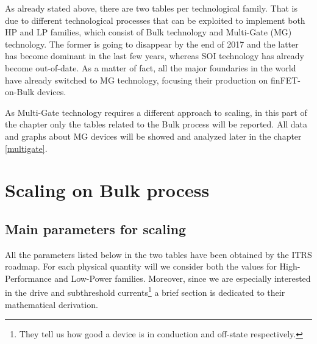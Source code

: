 \documentclass[a4paper, 12pt, twoside, openright]{report}
\begin{document}

As already stated above, there are two tables per technological family. That is due to different technological processes that can be exploited to implement both HP and LP families, which consist of Bulk technology and Multi-Gate (MG) technology. The former is going to disappear by the end of 2017 and the latter has become dominant in the last few years, whereas SOI technology has already become out-of-date. As a matter of fact, all the major foundaries in the world have already switched to MG technology, focusing their production on finFET-on-Bulk devices.

\noindent As Multi-Gate technology requires a different approach to scaling, in this part of the chapter only the tables related to the Bulk process will be reported. All data and graphs about MG devices will be showed and analyzed later in the chapter \ref{multigate}.

\newpage
\chapter{Scaling on Bulk process}

\section{Main parameters for scaling}
All the parameters listed below in the two tables have been obtained by the ITRS roadmap. For each physical quantity will we consider both the values for High-Performance and Low-Power families. Moreover, since we are especially interested in the drive and subthreshold currents\footnote{They tell us how good a device is in conduction and off-state respectively.} a brief section is dedicated to their mathematical derivation.
\end{document}
